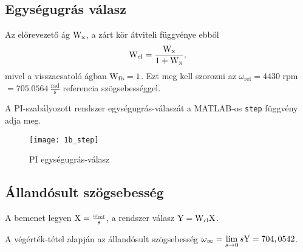 
\subsection{Egységugrás válasz}

Az előrevezető ág $\mathrm{W}_\text{x}$, a zárt kör átviteli függvénye ebből
\begin{equation}
	\mathrm{W}_\text{cl} = \frac{\mathrm{W}_\text{x}}{1+\mathrm{W}_\text{x}},
\end{equation}
mivel a visszacsatoló ágban $\mathrm{W}_\text{fb}=1$.
Ezt meg kell szorozni az $\omega_\text{ref} = 4430$ rpm $ = 705.0564~\frac{\text{rad}}{\text{s}} $ referencia szögsebességgel.

A PI-szabályozott rendszer egységugrás-válaszát a MATLAB-os \verb|step| függvény adja meg.
\begin{figure}[H]
	\centering
	\texttt{[image: 1b\_step]}
	\caption{PI egységugrás-válasz}
	\label{fig:1b_step}
\end{figure}


\subsection{Állandósult szögsebesség}

A bemenet legyen $\mathrm{X} = \frac{\omega_\text{ref}}{s}$, a rendszer válasz $\mathrm{Y} = \mathrm{W}_\text{cl}\mathrm{X}$.

A végérték-tétel alapján az állandósult szögsebesség $\omega_\infty = \lim\limits_{s\rightarrow 0}s\mathrm{Y} = 704,0542$.

